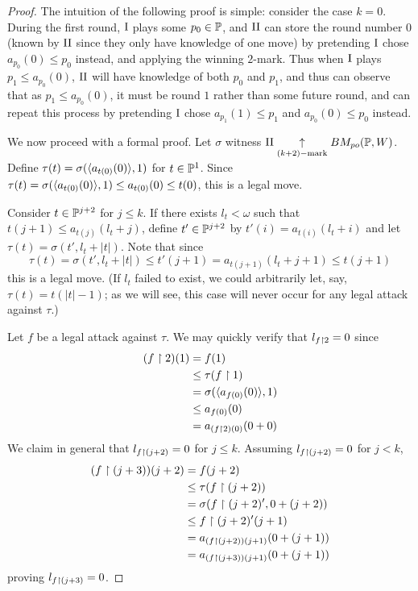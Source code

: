 \documentclass[11pt]{article}
\theoremstyle{plain}
\theoremstyle{definition}
\theoremstyle{remark}
\theoremstyle{plain}
\theoremstyle{definition}
\theoremstyle{remark}
\newcommand{\bmPoGame}[2]{BM_{po}(#1,#2)}
\begin{document}
  \begin{proof}
    The intuition of the following proof is simple: consider the case
    \(k=0\). During the first round,
    \(\mathrm{I}\) plays some \(p_0\in\mathbb{P}\), and
    \(\mathrm{II}\) can store the round number \(0\) (known by \(\mathrm{II}\) since they
    only have knowledge of one move) by pretending \(\mathrm{I}\) chose
    \(a_{p_0}(0)\leq p_0\) instead, and applying the winning \(2\)-mark.
    Thus when \(\mathrm{I}\) plays \(p_1\leq a_{p_0}(0)\), \(\mathrm{II}\) will have
    knowledge of both \(p_0\) and \(p_1\), and thus can observe that as
    \(p_1\leq a_{p_0}(0)\), it must be round \(1\) rather than some future
    round, and can repeat this process by pretending \(\mathrm{I}\) chose
    \(a_{p_1}(1)\leq p_1\) and \(a_{p_0}(0)\leq p_0\) instead.

    We now proceed with a formal proof.
    Let \(\sigma\) witness \(\plII\kmarkwin{(k+2)}\bmPoGame{\mb P}{W}\).
    Define \(\tau(t)=\sigma(\langle a_{t(0)}(0)\rangle,1)\) for \(t\in\mathbb{P}^1\).
    Since \(\tau(t)=\sigma(\langle a_{t(0)}(0)\rangle,1)\leq a_{t(0)}(0)\leq t(0)\),
    this is a legal move.

    Consider \(t\in\mathbb{P}^{j+2}\) for \(j\leq k\).
    If there exists \(l_t<\omega\) such that
    \(t(j+1)\leq a_{t(j)}(l_t+j)\),
    define \(t'\in\mathbb{P}^{j+2}\) by \(t'(i)=a_{t(i)}(l_t+i)\) and let
    \(\tau(t)=\sigma(t',l_t+|t|)\). Note that since
    \[
      \tau(t)
        =
      \sigma(t',l_t+|t|)
        \leq
      t'(j+1)
        =
      a_{t(j+1)}(l_t+j+1)
        \leq
      t(j+1)
    \]
    this is a legal move. (If \(l_t\) failed to exist,
    we could arbitrarily let, say,
    \(\tau(t)=t(|t|-1)\); as we will see, this case will never occur
    for any legal attack against \(\tau\).)

    Let \(f\) be a legal attack against \(\tau\).
    We may quickly verify
    that \(l_{f\restriction 2}=0\) since
    \begin{align*}
      (f\restriction 2)(1)
        &=
      f(1)
        \\&\leq
      \tau(f\restriction 1)
        \\&=
      \sigma(\langle a_{f(0)}(0)\rangle,1)
        \\&\leq
      a_{f(0)}(0)
        \\&=
      a_{(f\restriction 2)(0)}(0+0)
    \end{align*}
    We claim in general that \(l_{f\restriction(j+2)}=0\) for \(j\leq k\).
    Assuming \(l_{f\restriction(j+2)}=0\) for \(j<k\),
    \begin{align*}
      (f\restriction(j+3))(j+2)
        &=
      f(j+2)
        \\&\leq
      \tau(f\restriction(j+2))
        \\&=
      \sigma(f\restriction(j+2)',0+(j+2))
        \\&\leq
      f\restriction(j+2)'(j+1)
        \\&=
      a_{(f\restriction(j+2))(j+1)}(0+(j+1))
        \\&=
      a_{(f\restriction(j+3))(j+1)}(0+(j+1))
    \end{align*}
    proving \(l_{f\restriction(j+3)}=0\).


\end{proof}
\end{document}
